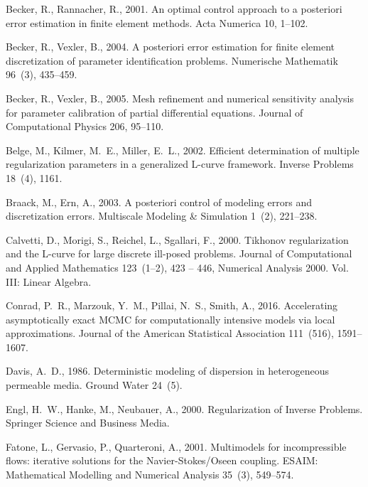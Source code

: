 \documentclass[review,sort&compress]{elsarticle}
\theoremstyle{plain} %
\theoremstyle{definition} %
\begin{document}
\begin{thebibliography}{42}
Becker, R., Rannacher, R., 2001. An optimal control approach to a posteriori
  error estimation in finite element methods. Acta Numerica 10, 1--102.

Becker, R., Vexler, B., 2004. A posteriori error estimation for finite element
  discretization of parameter identification problems. Numerische Mathematik
  96~(3), 435--459.

Becker, R., Vexler, B., 2005. Mesh refinement and numerical sensitivity
  analysis for parameter calibration of partial differential equations. Journal
  of Computational Physics 206, 95--110.

Belge, M., Kilmer, M.~E., Miller, E.~L., 2002. Efficient determination of
  multiple regularization parameters in a generalized {L}-curve framework.
  Inverse Problems 18~(4), 1161.

Braack, M., Ern, A., 2003. A posteriori control of modeling errors and
  discretization errors. Multiscale Modeling \& Simulation 1~(2), 221--238.

Calvetti, D., Morigi, S., Reichel, L., Sgallari, F., 2000. Tikhonov
  regularization and the {L}-curve for large discrete ill-posed problems.
  Journal of Computational and Applied Mathematics 123~(1–2), 423 -- 446,
  {N}umerical Analysis 2000. Vol. III: Linear Algebra.

Conrad, P.~R., Marzouk, Y.~M., Pillai, N.~S., Smith, A., 2016. Accelerating
  asymptotically exact {MCMC} for computationally intensive models via local
  approximations. Journal of the American Statistical Association 111~(516),
  1591--1607.

Davis, A.~D., 1986. Deterministic modeling of dispersion in heterogeneous
  permeable media. Ground Water 24~(5).

Engl, H.~W., Hanke, M., Neubauer, A., 2000. Regularization of Inverse Problems.
  Springer Science and Business Media.

Fatone, L., Gervasio, P., Quarteroni, A., 2001. Multimodels for incompressible
  flows: iterative solutions for the {N}avier-{S}tokes/{O}seen coupling. ESAIM:
  Mathematical Modelling and Numerical Analysis 35~(3), 549--574.


\end{thebibliography}
\end{document}
